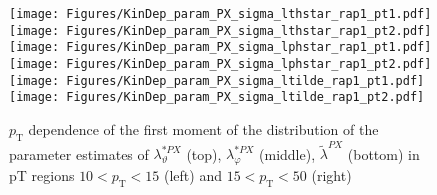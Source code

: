 \documentclass[12pt]{article}
\newcommand{\pT}{p_\mathrm{T}}
\newcommand{\lamtildePX}{\tilde{\lambda}^{\scriptscriptstyle PX}}
\newcommand{\lamthstarPX}{\lambda^{* \scriptscriptstyle PX}_\vartheta}
\newcommand{\lamphstarPX}{\lambda^{* \scriptscriptstyle PX}_\varphi}
\begin{document}
\begin{figure}[htbp]
\centering
\texttt{[image: Figures/KinDep\_param\_PX\_sigma\_lthstar\_rap1\_pt1.pdf]}
\texttt{[image: Figures/KinDep\_param\_PX\_sigma\_lthstar\_rap1\_pt2.pdf]}
\texttt{[image: Figures/KinDep\_param\_PX\_sigma\_lphstar\_rap1\_pt1.pdf]}
\texttt{[image: Figures/KinDep\_param\_PX\_sigma\_lphstar\_rap1\_pt2.pdf]}
\texttt{[image: Figures/KinDep\_param\_PX\_sigma\_ltilde\_rap1\_pt1.pdf]}
\texttt{[image: Figures/KinDep\_param\_PX\_sigma\_ltilde\_rap1\_pt2.pdf]}
\caption{$\pT$ dependence of the first moment of the distribution of the parameter estimates of $\lamthstarPX$ (top), $\lamphstarPX$ (middle), $\lamtildePX$ (bottom) in pT regions $10<\pT<15$ (left) and $15<\pT<50$ (right)}
\end{figure}
\clearpage
\end{document}

